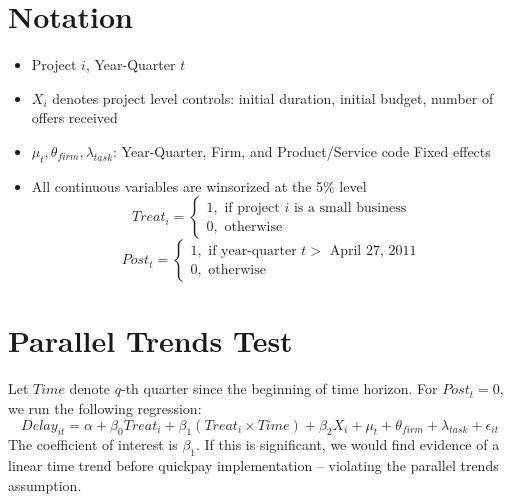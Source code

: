 \documentclass[]{article}
\providecommand{\tightlist}{%
  \setlength{\itemsep}{0pt}\setlength{\parskip}{0pt}}
\begin{document}
\hypertarget{notation}{%
\section{Notation}\label{notation}}

\begin{itemize}
\tightlist
\item
  Project \(i\), Year-Quarter \(t\)
\item
  \(X_i\) denotes project level controls: initial duration, initial
  budget, number of offers received
\item
  \(\mu_t,\theta_{firm},\lambda_{task}\): Year-Quarter, Firm, and
  Product/Service code Fixed effects
\item
  All continuous variables are winsorized at the 5\% level
  \[ Treat_i = \begin{cases} 1, \text{ if project } i \text{ is a small business}\\
  0, \text{ otherwise} \end{cases}\]
  \[ Post_t = \begin{cases} 1, \text{ if year-quarter } t > \text{ April 27, 2011}\\
  0, \text{ otherwise} \end{cases}\]
\end{itemize}

\hypertarget{parallel-trends-test}{%
\section{Parallel Trends Test}\label{parallel-trends-test}}

Let \(Time\) denote \(q\)-th quarter since the beginning of time
horizon. For \(Post_t =0\), we run the following regression:
\[ Delay_{it} = \alpha+\beta_0 Treat_i + \beta_1 (Treat_i \times Time) + \beta_2 X_i + \mu_t + \theta_{firm} + \lambda_{task} +\epsilon_{it}\]
The coefficient of interest is \(\beta_1\). If this is significant, we
would find evidence of a linear time trend before quickpay
implementation -- violating the parallel trends assumption.
\end{document}
